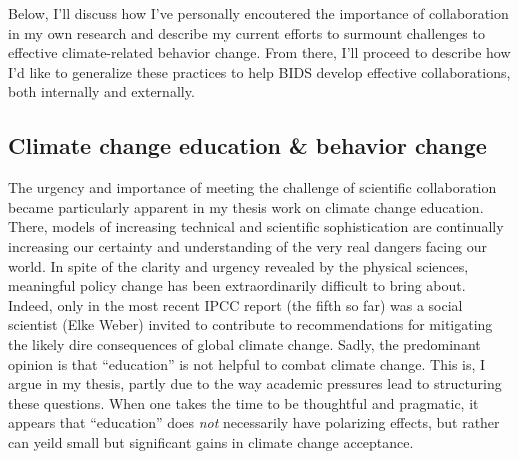 
Below, I'll discuss how I've personally encoutered the importance of
collaboration in my own research and describe my current efforts to surmount
challenges to effective climate-related behavior change. From there, I'll
proceed to describe how I'd like to generalize these practices to help BIDS
develop effective collaborations, both internally and externally.

\subsection*{Climate change education \& behavior change}


The urgency and importance of meeting the challenge of scientific collaboration
became particularly apparent in my thesis work on climate change education.
There, models of increasing technical and scientific sophistication are
continually increasing our certainty and understanding of the very real dangers
facing our world. In spite of the clarity and urgency revealed by the physical
sciences, meaningful policy change has been extraordinarily difficult to bring
about. Indeed, only in the most recent IPCC report (the fifth so far) was a
social scientist (Elke Weber) invited to contribute to recommendations for
mitigating the likely dire consequences of global climate change. Sadly, the
predominant opinion is that “education” is not helpful to combat climate change.
This is, I argue in my thesis, partly due to the way academic pressures lead to
structuring these questions. When one takes the time to be thoughtful and
pragmatic, it appears that “education” does \emph{not} necessarily have
polarizing effects, but rather can yeild small but significant gains in climate
change acceptance.


